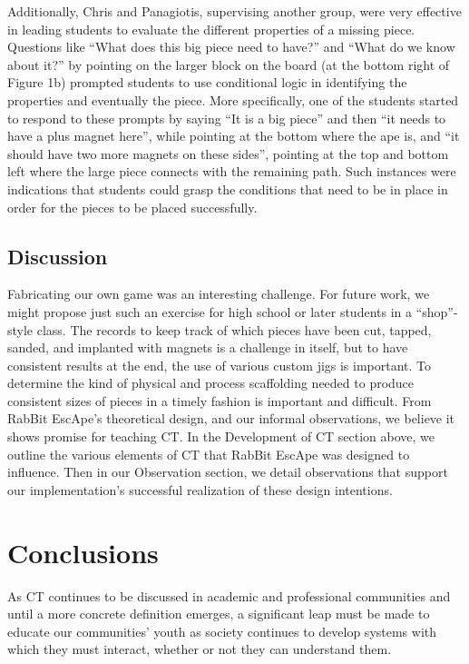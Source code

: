 \documentclass{acm_proc_article-sp}
\begin{document}
Additionally, Chris and Panagiotis, supervising another group, were very effective in leading students to evaluate the different properties of a missing piece. Questions like ``What does this big piece need to have?'' and ``What do we know about it?'' by pointing on the larger block on the board (at the bottom right of Figure 1b) prompted students to use conditional logic in identifying the properties and eventually the piece. More specifically, one of the students started to respond to these prompts by saying ``It is a big piece'' and then ``it needs to have a plus magnet here'', while pointing at the bottom where the ape is, and ``it should have two more magnets on these sides'', pointing at the top and bottom left where the large piece connects with the remaining path. Such instances were indications that students could grasp the conditions that need to be in place in order for the pieces to be placed successfully.

\subsection{Discussion}
Fabricating our own game was an interesting challenge. For future work, we might propose just such an exercise for high school or later students in a ``shop''-style class. The records to keep track of which pieces have been cut, tapped, sanded, and implanted with magnets is a challenge in itself, but to have consistent results at the end, the use of various custom jigs is important. To determine the kind of physical and process scaffolding needed to produce consistent sizes of pieces in a timely fashion is important and difficult. 
From RabBit EscApe’s theoretical design, and our informal observations, we believe it shows promise for teaching CT. In the Development of CT section above, we outline the various elements of CT that RabBit EscApe was designed to influence. Then in our Observation section, we detail observations that support our implementation’s successful realization of these design intentions. 

\section{Conclusions}
As CT continues to be discussed in academic and professional communities and until a more concrete definition emerges, a significant leap must be made to educate our communities’ youth as society continues to develop systems with which they must interact, whether or not they can understand them. 
\end{document}
